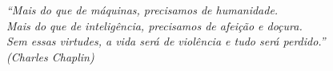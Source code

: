 \begin{epigrafe}
    \vspace*{\fill}
	\begin{flushright}
		\textit{``Mais do que de máquinas, precisamos de humanidade. \\
		Mais do que de inteligência, precisamos de afeição e doçura. \\
		Sem essas virtudes, a vida será de violência e tudo será perdido.''\\
		          (Charles Chaplin)}
	\end{flushright}
\end{epigrafe}
